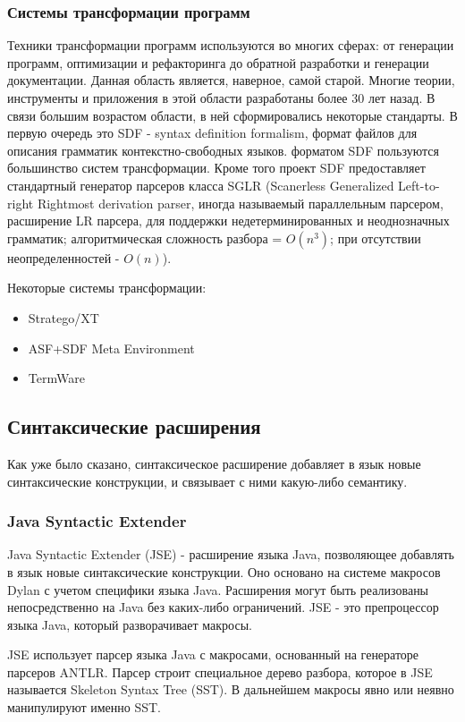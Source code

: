 \documentclass[a4paper,12pt]{article}
\begin{document}
\subsubsection{Системы трансформации программ}
Техники трансформации программ используются во многих сферах: от генерации
программ, оптимизации и рефакторинга до обратной разработки и генерации
документации.
Данная область является, наверное, самой старой. Многие теории, инструменты и
приложения в этой области разработаны более 30 лет назад.
В связи большим возрастом области, в ней сформировались некоторые стандарты.
В первую очередь это SDF - syntax definition formalism, формат файлов для
описания грамматик контекстно-свободных языков. форматом SDF пользуются
большинство систем трансформации.
Кроме того проект SDF предоставляет стандартный генератор парсеров класса SGLR
(Scanerless Generalized Left-to-right Rightmost derivation parser, иногда
называемый параллельным парсером, расширение LR парсера, для поддержки
недетерминированных и неоднозначных грамматик; алгоритмическая сложность разбора
= $O(n^3)$; при отсутствии неопределенностей - $O(n)$).

Некоторые системы трансформации:
\begin{itemize}
  \item Stratego/XT
  \item ASF+SDF Meta Environment
  \item TermWare
\end{itemize}

\subsection{Синтаксические расширения}
Как уже было сказано, синтаксическое расширение добавляет в язык новые
синтаксические конструкции, и связывает с ними какую-либо семантику.

\subsubsection{Java Syntactic Extender}
Java Syntactic Extender (JSE) - расширение языка Java, позволяющее добавлять в
язык новые синтаксические конструкции. Оно основано на системе макросов Dylan с
учетом специфики языка Java. Расширения могут быть реализованы
непосредственно на Java без каких-либо ограничений. JSE - это
препроцессор языка Java, который разворачивает макросы.

JSE использует парсер языка Java с макросами, основанный на генераторе парсеров
ANTLR. Парсер строит специальное дерево разбора, которое в JSE называется
Skeleton Syntax Tree (SST). В дальнейшем макросы явно или неявно манипулируют
именно SST.
\end{document}
